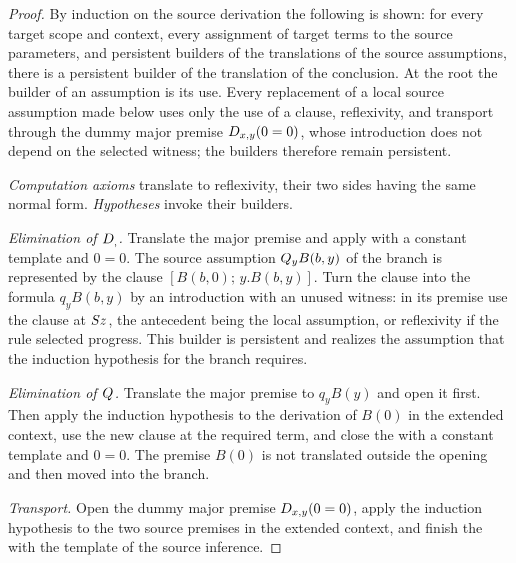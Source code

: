 \begin{proof}
By induction on the source derivation the following is shown: for every
target scope and context, every assignment of target terms to the source
parameters, and persistent builders of the translations of the source
assumptions, there is a persistent builder of the translation of the
conclusion.  At the root the builder of an assumption is its use.  Every
replacement of a local source assumption made below uses only the use of a
clause, reflexivity, and transport through the dummy major premise
$D_{x,y}(0=0)$, whose introduction does not depend on the selected
witness; the builders therefore remain persistent.

\emph{Computation axioms} translate to reflexivity, their two sides having
the same normal form.  \emph{Hypotheses} invoke their builders.

\emph{Elimination of $D_{,}$.}  Translate the major premise and apply
 with a constant template and $0=0$.  The source
assumption $Q_{y}B(b,y)$ of the branch is represented by the clause
$[B(b,0);\,y.B(b,y)]$.  Turn the clause into the formula $q_yB(b,y)$ by an
introduction with an unused witness: in its premise use the clause at
$S z$, the antecedent being the local assumption, or reflexivity if the
rule selected progress.  This builder is persistent and realizes the
assumption that the induction hypothesis for the branch requires.

\emph{Elimination of $Q_{}$.}  Translate the major premise to $q_yB(y)$ and
open it first.  Then apply the induction hypothesis to the derivation of
$B(0)$ in the extended context, use the new clause at the required term, and
close the  with a constant template and $0=0$.  The
premise $B(0)$ is not translated outside the opening and then moved into the
branch.

\emph{Transport.}  Open the dummy major premise $D_{x,y}(0=0)$, apply the
induction hypothesis to the two source premises in the extended context,
and finish the  with the template of the source
inference.


\end{proof}
